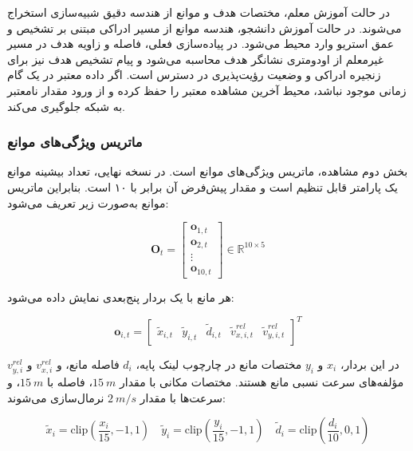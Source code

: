 در حالت آموزش معلم، مختصات هدف و موانع از هندسه دقیق شبیه‌سازی استخراج می‌شوند. در حالت آموزش دانشجو، هندسه موانع از مسیر ادراکی مبتنی بر تشخیص و عمق استریو وارد محیط می‌شود. در پیاده‌سازی فعلی، فاصله و زاویه هدف در مسیر غیرمعلم از اودومتری نشانگر هدف محاسبه می‌شود و پیام تشخیص هدف نیز برای زنجیره ادراکی و وضعیت رؤیت‌پذیری در دسترس است. اگر داده معتبر در یک گام زمانی موجود نباشد، محیط آخرین مشاهده معتبر را حفظ کرده و از ورود مقدار نامعتبر به شبکه جلوگیری می‌کند.

\subsubsection{ماتریس ویژگی‌های موانع}
\label{subsubsec:obstacle_features_final}

بخش دوم مشاهده، ماتریس ویژگی‌های موانع است. در نسخه نهایی، تعداد بیشینه موانع یک پارامتر قابل تنظیم است و مقدار پیش‌فرض آن برابر با ۱۰ است. بنابراین ماتریس موانع به‌صورت زیر تعریف می‌شود:

\begin{equation}
	\mathbf{O}_t =
	\begin{bmatrix}
		\mathbf{o}_{1,t} \\
		\mathbf{o}_{2,t} \\
		\vdots \\
		\mathbf{o}_{10,t}
	\end{bmatrix}
	\in \mathbb{R}^{10\times 5}
	\label{eq:obstacle_matrix_10x5_final}
\end{equation}

هر مانع با یک بردار پنج‌بعدی نمایش داده می‌شود:

\begin{equation}
	\mathbf{o}_{i,t}=
	\begin{bmatrix}
		\tilde{x}_{i,t} &
		\tilde{y}_{i,t} &
		\tilde{d}_{i,t} &
		\tilde{v}^{rel}_{x,i,t} &
		\tilde{v}^{rel}_{y,i,t}
	\end{bmatrix}^{T}
	\label{eq:single_obstacle_feature_final}
\end{equation}

در این بردار، \(x_i\) و \(y_i\) مختصات مانع در چارچوب لینک پایه، \(d_i\) فاصله مانع، و \(v^{rel}_{x,i}\) و \(v^{rel}_{y,i}\) مؤلفه‌های سرعت نسبی مانع هستند. مختصات مکانی با مقدار \(15~m\)، فاصله با \(15~m\)، و سرعت‌ها با مقدار \(2~m/s\) نرمال‌سازی می‌شوند:

\begin{equation}
	\tilde{x}_i=\mathrm{clip}\left(\frac{x_i}{15},-1,1\right)\quad
	\tilde{y}_i=\mathrm{clip}\left(\frac{y_i}{15},-1,1\right)\quad
	\tilde{d}_i=\mathrm{clip}\left(\frac{d_i}{10},0,1\right)
	\label{eq:obstacle_position_normalization_final}
\end{equation}

